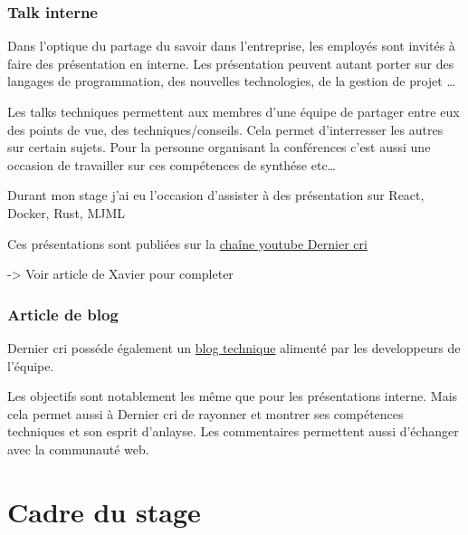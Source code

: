 \documentclass[12pt,a4paper]{article}
\begin{document}
  \bigskip

  \subsubsection{Talk interne}\label{talk-interne}

  \bigskip

  Dans l'optique du partage du savoir dans l'entreprise, les employés sont
  invités à faire des présentation en interne. Les présentation peuvent
  autant porter sur des langages de programmation, des nouvelles
  technologies, de la gestion de projet \ldots{}

  \bigskip

  Les talks techniques permettent aux membres d'une équipe de partager
  entre eux des points de vue, des techniques/conseils. Cela permet
  d'interresser les autres sur certain sujets. Pour la personne organisant
  la conférences c'est aussi une occasion de travailler sur ces
  compétences de synthése etc\ldots{}

  \bigskip

  Durant mon stage j'ai eu l'occasion d'assister à des présentation sur
  React, Docker, Rust, MJML

  \bigskip

  Ces présentations sont publiées sur la
  \href{https://www.youtube.com/channel/UCDfdBlzldhg_PEu3xZTPsHg}{chaîne
  youtube Dernier cri}

  \bigskip

  -\textgreater{} Voir article de Xavier pour completer

  \subsubsection{Article de blog}\label{article-de-blog}

  \bigskip

  Dernier cri posséde également un
  \href{http://derniercri.io/tech-blog}{blog technique} alimenté par les
  developpeurs de l'équipe.

  \bigskip

  Les objectifs sont notablement les même que pour les présentations
  interne. Mais cela permet aussi à Dernier cri de rayonner et montrer ses
  compétences techniques et son esprit d'anlayse. Les commentaires
  permettent aussi d'échanger avec la communauté web.

  \newpage

  \section{Cadre du stage}\label{cadre-du-stage}
\end{document}
